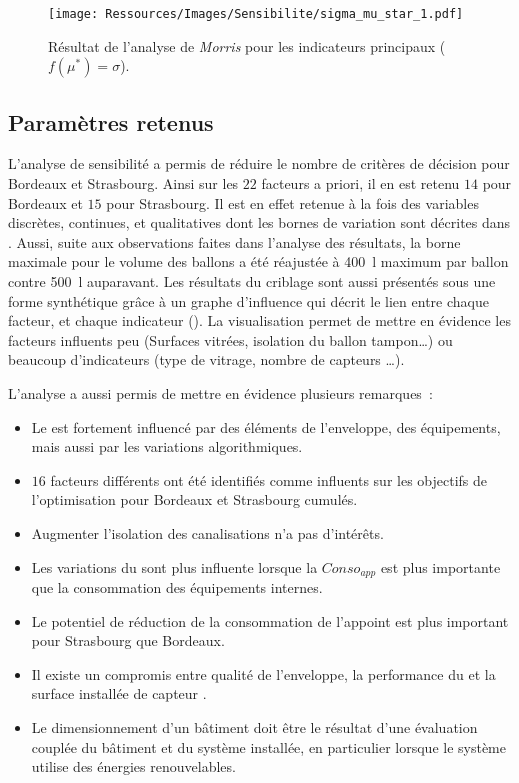 \begin{figure}
    \centering
    \texttt{[image: Ressources/Images/Sensibilite/sigma\_mu\_star\_1.pdf]}
    \caption{Résultat de l’analyse de \textit{Morris} pour les indicateurs principaux
             ($f(\mu^{*}) = \sigma$).}
    \label{fig:objectifs_mu_star}
\end{figure}



\subsection{Paramètres retenus} %
\label{sub:parametres_retenus}
L’analyse de sensibilité a permis de réduire le nombre de critères de décision
pour Bordeaux et Strasbourg. Ainsi sur les $22$ facteurs a priori, il en est retenu
$14$ pour Bordeaux et $15$ pour Strasbourg.  Il est en effet retenue à la fois des variables discrètes, continues,
et qualitatives dont les bornes de variation sont décrites dans .
Aussi, suite aux observations faites dans l’analyse des résultats, la borne maximale pour le volume des
ballons a été réajustée à \SI{400}{\litre} maximum par ballon contre \SI{500}{\litre}
auparavant.
Les résultats du criblage sont aussi présentés sous une forme synthétique grâce à un
graphe d’influence qui décrit le lien entre chaque facteur, et chaque indicateur
(). La visualisation permet de mettre en évidence
les facteurs influents peu (Surfaces vitrées, isolation du ballon tampon\dots) ou beaucoup
d’indicateurs (type de vitrage, nombre de capteurs \dots).

L’analyse a aussi permis de mettre en évidence plusieurs remarques~:
\begin{itemize}
  \item Le  est fortement influencé par des éléments de l’enveloppe, des équipements,
        mais aussi par les variations algorithmiques.
  \item $16$ facteurs différents ont été identifiés comme influents sur les objectifs de
        l’optimisation pour Bordeaux et Strasbourg cumulés.
  \item Augmenter l’isolation des canalisations n’a pas d’intérêts.
  \item Les variations du  sont plus influente lorsque la $Conso_{app}$
        est plus importante que la consommation des équipements internes.
  \item Le potentiel de réduction de la consommation de l’appoint est plus important
        pour Strasbourg que Bordeaux.
  \item Il existe un compromis entre qualité de l’enveloppe, la performance du 
        et la surface installée de capteur .
  \item Le dimensionnement d’un bâtiment doit être le résultat d’une évaluation
        couplée du bâtiment et du système installée, en particulier lorsque le système
        utilise des énergies renouvelables.
\end{itemize}

